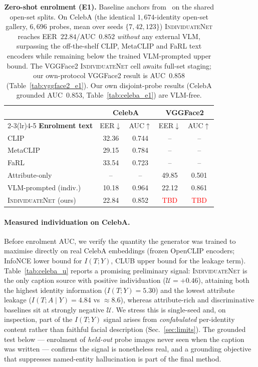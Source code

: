 \documentclass[10pt,twocolumn,letterpaper]{article}
\newcommand{\U}{\mathcal{U}}
\newcommand{\method}{\textsc{IndividuateNet}}
\newcommand{\tbd}{\textcolor{red}{\footnotesize TBD}}
\begin{document}
\begin{table}[t]
  \centering\small
  \setlength{\tabcolsep}{4pt}
  \begin{tabular}{@{}lcccc@{}}
    \toprule
    & \multicolumn{2}{c}{\textbf{CelebA}} & \multicolumn{2}{c}{\textbf{VGGFace2}} \\
    \cmidrule(lr){2-3}\cmidrule(lr){4-5}
    \textbf{Enrolment text} & EER$\downarrow$ & AUC$\uparrow$ & EER$\downarrow$ & AUC$\uparrow$ \\
    \midrule
    CLIP~\cite{clip}            & 32.36 & 0.744 & --    & --    \\
    MetaCLIP                    & 29.15 & 0.784 & --    & --    \\
    FaRL~\cite{farl}            & 33.54 & 0.723 & --    & --    \\
    Attribute-only              & --    & --    & 49.85 & 0.501 \\
    VLM-prompted (indiv.)       & 10.18 & 0.964 & 22.12 & 0.861 \\
    \midrule
    \method{} (ours)            & 22.84 & 0.852 & \tbd  & \tbd  \\
    \bottomrule
  \end{tabular}
  \caption{\textbf{Zero-shot enrolment (E1).} Baseline anchors from~\cite{semanticbio} on the
  shared open-set splits. On CelebA (the identical $1{,}674$-identity open-set gallery,
  $6{,}696$ probes, mean over seeds $\{7,42,123\}$) \method{} reaches EER~$22.84$/AUC~$0.852$
  \emph{without} any external VLM, surpassing the off-the-shelf CLIP, MetaCLIP and FaRL text
  encoders while remaining below the trained VLM-prompted upper bound. The VGGFace2 \method{}
  cell awaits full-set staging; our own-protocol VGGFace2 result is AUC~$0.858$
  (Table~\ref{tab:vggface2_e1}). Our own
  disjoint-probe results (CelebA grounded AUC~$0.853$, Table~\ref{tab:celeba_e1}) are VLM-free.}
  \label{tab:main}
\end{table}

\paragraph{Measured individuation on CelebA.}
Before enrolment AUC, we verify the quantity the generator was trained to maximise directly on
real CelebA embeddings (frozen OpenCLIP encoders; InfoNCE lower bound for $I(T;Y)$, CLUB upper
bound for the leakage term). Table~\ref{tab:celeba_u} reports a promising preliminary signal:
\method{} is the only caption source with positive individuation ($\U=+0.46$), attaining both
the highest identity information ($I(T;Y)=5.30$) and the lowest attribute leakage
($I(T;A\mid Y)=4.84$ vs $\approx\!8.6$), whereas attribute-rich and discriminative baselines
sit at strongly negative $\U$. We stress this is single-seed and, on inspection, part of the
$I(T;Y)$ signal arises from \emph{confabulated} per-identity content rather than faithful
facial description (Sec.~\ref{sec:limits}). The grounded test below --- enrolment of
\emph{held-out} probe images never seen when the caption was written --- confirms the signal is
nonetheless real, and a grounding objective that suppresses named-entity hallucination is part
of the final method.
\end{document}
